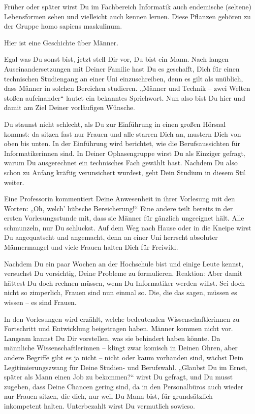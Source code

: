 {Früher oder später wirst Du im Fachbereich Informatik auch endemische (seltene) Lebensformen sehen und vielleicht auch kennen lernen. Diese Pflanzen gehören zu der Gruppe homo sapiens maskulinum.
}{Hier ist eine Geschichte über Männer.

    Egal was Du sonst bist, jetzt stell Dir vor, Du bist ein Mann. Nach langen Auseinandersetzungen mit Deiner Familie hast Du es geschafft, Dich für einen technischen Studiengang an einer Uni einzuschreiben, denn es gilt als unüblich, dass Männer in solchen Bereichen studieren. „Männer und Technik – zwei Welten stoßen aufeinander“ lautet ein bekanntes Sprichwort. Nun also bist Du hier und damit am Ziel Deiner vorläufigen Wünsche.

    Du staunst nicht schlecht, als Du zur Einführung in einen großen Hörsaal kommst: da sitzen fast nur Frauen und alle starren Dich an, mustern Dich von oben bis unten. In der Einführung wird berichtet, wie die Berufsaussichten für Informatikerinnen sind. In Deiner Ophasengruppe wirst Du als Einziger gefragt, warum Du ausgerechnet ein technisches Fach gewählt hast. Nachdem Du also schon zu Anfang kräftig verunsichert wurdest, geht Dein Studium in diesem Stil weiter.

    Eine Professorin kommentiert Deine Anwesenheit in ihrer Vorlesung mit den Worten: „Oh, welch' hübsche Bereicherung!“ Eine andere teilt bereits in der ersten Vorlesungsstunde mit, dass sie Männer für gänzlich ungeeignet hält. Alle schmunzeln, nur Du schluckst. Auf dem Weg nach Hause oder in die Kneipe wirst Du angequatscht und angemacht, denn an einer Uni herrscht absoluter Männermangel und viele Frauen halten Dich für Freiwild.

    Nachdem Du ein paar Wochen an der Hochschule bist und einige Leute kennst, versuchst Du vorsichtig, Deine Probleme zu formulieren. Reaktion: Aber damit hättest Du doch rechnen müssen, wenn Du Informatiker werden willst. Sei doch nicht so zimperlich, Frauen sind nun einmal so. Die, die das sagen, müssen es wissen – es sind Frauen.

    In den Vorlesungen wird erzählt, welche bedeutenden Wissenschaftlerinnen zu Fortschritt und Entwicklung beigetragen haben. Männer kommen nicht vor. Langsam kannst Du Dir vorstellen, was sie behindert haben könnte. Da männliche Wissenschaftlerinnen – klingt zwar komisch in Deinen Ohren, aber andere Begriffe gibt es ja nicht – nicht oder kaum vorhanden sind, wächst Dein Legitimierungszwang für Deine Studien- und Berufswahl. „Glaubst Du im Ernst, später als Mann einen Job zu bekommen?“ wirst Du gefragt, und Du musst zugeben, dass Deine Chancen gering sind, da in den Personalbüros auch  wieder nur Frauen sitzen, die dich, nur weil Du Mann bist, für grundsätzlich inkompetent halten. Unterbezahlt wirst Du vermutlich sowieso.

}
